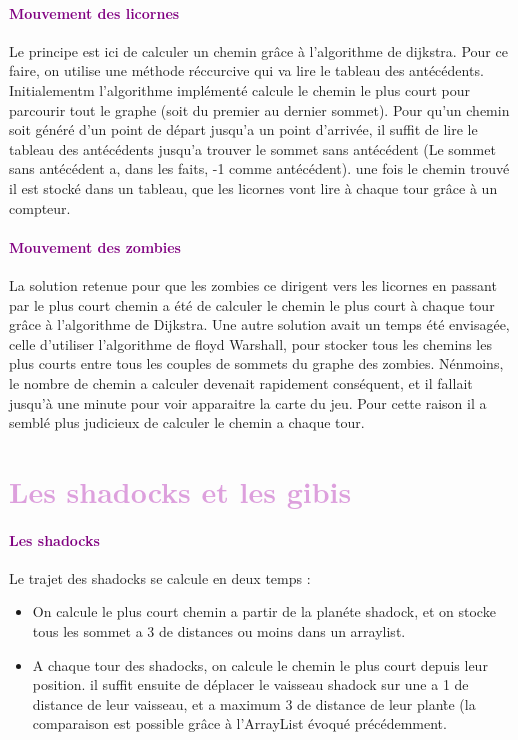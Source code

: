 \documentclass{report}
\begin{document}
			\paragraph{\textcolor{purple}{Mouvement des licornes}}
			Le principe est ici de calculer un chemin gr\^ace \`a l'algorithme de dijkstra. Pour ce faire, on utilise une m\'ethode r\'eccurcive qui va lire le tableau des ant\'ec\'edents. Initialementm l'algorithme impl\'ement\'e calcule le chemin le plus court pour parcourir tout le graphe (soit du premier au dernier sommet). Pour qu'un chemin soit g\'en\'er\'e d'un point de d\'epart jusqu'a un point d'arriv\'ee, il suffit de lire le tableau des ant\'ec\'edents jusqu'a trouver le sommet sans ant\'ec\'edent (Le sommet sans ant\'ec\'edent a, dans les faits, -1 comme ant\'ec\'edent). une fois le chemin trouv\'e il est stock\'e dans un tableau, que les licornes vont lire \`a chaque tour gr\^ace \`a un compteur.
			\paragraph{\textcolor{purple}{Mouvement des zombies}}
			
			La solution retenue pour que les zombies ce dirigent vers les licornes en passant par le plus court chemin a \'et\'e de calculer le chemin le plus court \`a chaque tour gr\^ace \`a l'algorithme de Dijkstra. Une autre solution avait un temps \'et\'e envisag\'ee, celle d'utiliser l'algorithme de floyd Warshall, pour stocker tous les chemins les plus courts entre tous les couples de sommets du graphe des zombies. N\'enmoins, le nombre de chemin a calculer devenait rapidement cons\'equent, et il fallait jusqu'\`a une minute pour voir apparaitre la carte du jeu. Pour cette raison il a sembl\'e plus judicieux de calculer le chemin a chaque tour.
			
	\section*{\textcolor{Plum}{Les shadocks et les gibis}}			
			\paragraph{\textcolor{purple}{Les shadocks}}
			Le trajet des shadocks se calcule en deux temps :
				
			\begin{itemize}
				\item On calcule le plus court chemin a partir de la plan\'ete shadock, et on stocke tous les sommet a 3 de distances ou moins dans un arraylist.
				\item A chaque tour des shadocks, on calcule le chemin le plus court depuis leur position. il suffit ensuite de d\'eplacer le vaisseau shadock sur une a 1 de distance de leur vaisseau, et a maximum 3 de distance de leur plan\`te (la comparaison est possible gr\^ace \`a l'ArrayList \'evoqu\'e pr\'ec\'edemment.
			\end{itemize}
\end{document}
